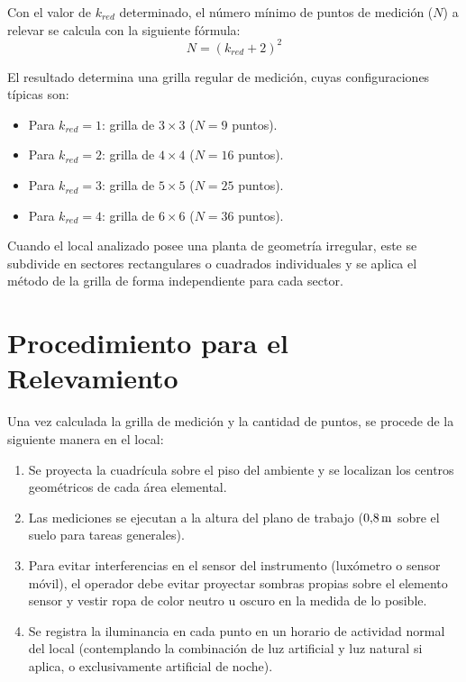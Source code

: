 Con el valor de $k_{red}$ determinado, el número mínimo de puntos de medición ($N$) a relevar se calcula con la
siguiente fórmula:
\begin{equation}
    N = (k_{red} + 2)^2
    \label{eq.tp2:num_puntos}
\end{equation}

El resultado determina una grilla regular de medición, cuyas configuraciones típicas son:
\begin{itemize}
    \item Para $k_{red} = 1$: grilla de $3 \times 3$ ($N = 9$ puntos).
    \item Para $k_{red} = 2$: grilla de $4 \times 4$ ($N = 16$ puntos).
    \item Para $k_{red} = 3$: grilla de $5 \times 5$ ($N = 25$ puntos).
    \item Para $k_{red} = 4$: grilla de $6 \times 6$ ($N = 36$ puntos).
\end{itemize}

Cuando el local analizado posee una planta de geometría irregular, este se subdivide en sectores rectangulares o
cuadrados individuales y se aplica el método de la grilla de forma independiente para cada sector.

\section{Procedimiento para el Relevamiento}
\label{sec.tp2:procedimiento}

Una vez calculada la grilla de medición y la cantidad de puntos, se procede de la siguiente manera en el local:
\begin{enumerate}
    \item Se proyecta la cuadrícula sobre el piso del ambiente y se localizan los centros geométricos de cada área elemental.
    \item Las mediciones se ejecutan a la altura del plano de trabajo ($0{,}8\,\mathrm{m}$ sobre el suelo para tareas generales).
    \item Para evitar interferencias en el sensor del instrumento (luxómetro o sensor móvil), el operador debe evitar proyectar sombras propias sobre el elemento sensor y vestir ropa de color neutro u oscuro en la medida de lo posible.
    \item Se registra la iluminancia en cada punto en un horario de actividad normal del local (contemplando la combinación de luz artificial y luz natural si aplica, o exclusivamente artificial de noche).
\end{enumerate}

